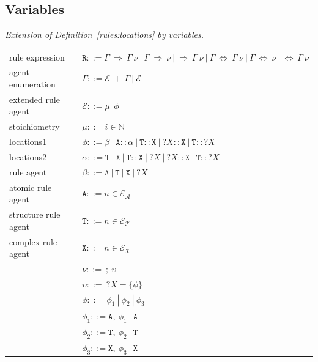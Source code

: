 \documentclass{elsarticle}
\begin{document}
\subsection{Variables}

\begin{definition}\label{rules:variables}
\emph{Extension of Definition~\ref{rules:locations} by variables.}

\begin{center}
{\small
\hspace*{-1cm}\begin{tabular}{ l l }
rule expression & $\mathtt{R} ::= \Gamma ~\Rightarrow~ \Gamma ~\nu ~|~ \Gamma ~\Rightarrow ~\nu ~|~ \Rightarrow~ \Gamma ~\nu ~|~ \Gamma ~\Leftrightarrow~ \Gamma ~\nu ~|~ \Gamma ~\Leftrightarrow ~\nu ~|~ \Leftrightarrow~ \Gamma ~\nu $\\
 agent enumeration & $\Gamma ::= \mathcal{E}~ +~\Gamma ~|~ \mathcal{E}$\\
 extended rule agent & $\mathcal{E} ::= \mu ~~ \phi$\\
 stoichiometry & $\mu ::= i \in \mathbb{N}$\\
 locations1 & $\phi ::= \beta ~|~ \mathtt{A} :: \alpha ~|~ \mathtt{T}::\mathtt{X} ~|~ ?X::\mathtt{X} ~|~ \mathtt{T}::?X$\\
 locations2 & $\alpha ::= \mathtt{T} ~|~ \mathtt{X} ~|~ \mathtt{T} :: \mathtt{X} ~|~ ?X ~|~ ?X::\mathtt{X} ~|~ \mathtt{T}::?X$\\
 rule agent & $\beta ::= \mathtt{A} ~|~ \mathtt{T} ~|~ \mathtt{X} ~|~ ?X$\\
 atomic rule agent & $\mathtt{A} ::= n \in \mathcal{E}_\mathcal{A}$\\
 structure rule agent & $\mathtt{T} ::= n \in \mathcal{E}_\mathcal{T}$\\
 complex rule agent & $\mathtt{X} ::= n \in \mathcal{E}_\mathcal{X}$\\

& $\nu ::=~ ;~\upsilon$\\
& $\upsilon ::=~?X = \{\phi\}$\\
& $\phi ::=~\phi_1~|~\phi_2~|~\phi_3$\\
& $\phi_1 ::= \mathtt{A},~\phi_1~|~\mathtt{A}$\\
& $\phi_2 ::= \mathtt{T},~\phi_2~|~\mathtt{T}$\\
& $\phi_3 ::= \mathtt{X},~\phi_3~|~\mathtt{X}$\\
\end{tabular}
}
\end{center}

\end{definition}
\end{document}
